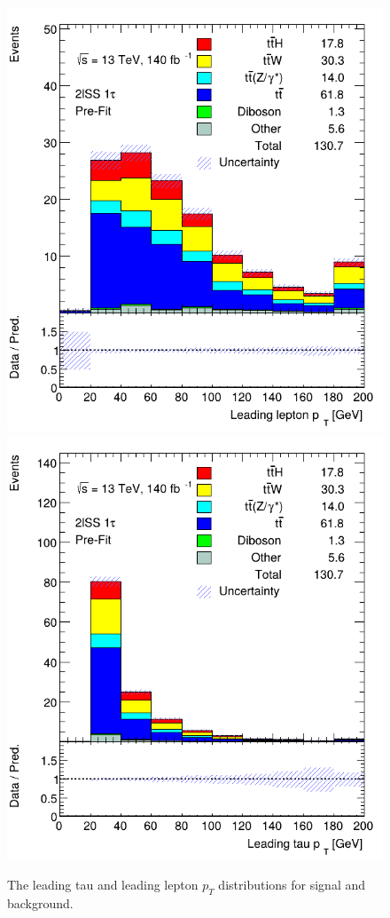 \begin{figure}[ht]
    \centering
    
    \includegraphics[scale=0.3]{res/AnalysisPlots/lep-pt-0.png}
    \includegraphics[scale=0.3]{res/AnalysisPlots/tau-pt-0.png}

    \caption{The leading tau and leading lepton $p_T$ distributions for signal and background.}
    \label{tauAndLeadingLepPt}
\end{figure}